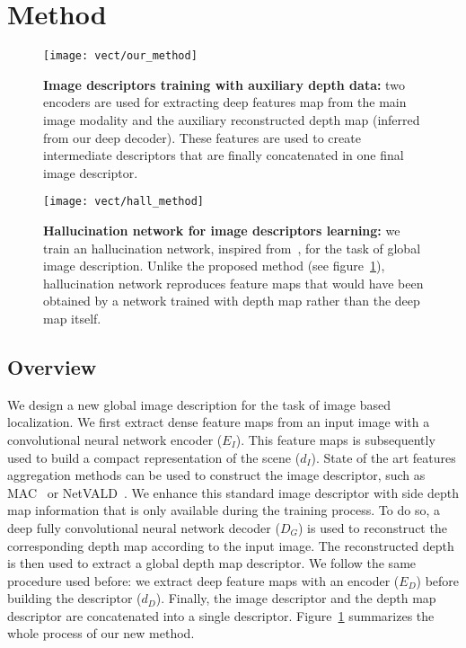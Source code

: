 \section{Method}
\label{sec:method}

\begin{figure}
	\center
	\texttt{[image: vect/our\_method]}
	\caption{\label{fig:our_method} \textbf{Image descriptors training with auxiliary depth data:} two encoders are used for extracting deep features map from the main image modality and the auxiliary reconstructed depth map (inferred from our deep decoder). These features are used to create intermediate descriptors that are finally concatenated in one final image descriptor.}
\end{figure}

\begin{figure}
	\center
	\texttt{[image: vect/hall\_method]}
	\caption{\label{fig:hall_method} \textbf{Hallucination network for image descriptors learning:} we train an hallucination network, inspired from~\cite{Hoffman2016}, for the task of global image description. Unlike the proposed method (see figure~\ref{fig:our_method}), hallucination network reproduces feature maps that would have been obtained by a network trained with depth map rather than the deep map itself.}
\end{figure}

\subsection{Overview}
\label{subsec:overview}
We design a new global image description for the task of image based localization. We first extract dense feature maps from an input image with a convolutional neural network encoder ($E_I$). This feature maps is subsequently used to build a compact representation of the scene ($d_I$). State of the art features aggregation methods can be used to construct the image descriptor, such as MAC~\cite{Radenovic2017} or NetVALD~\cite{Arandjelovic2017}. We enhance this standard image descriptor with side depth map information that is only available during the training process. To do so, a deep fully convolutional neural network decoder ($D_G$) is used to reconstruct the corresponding depth map according to the input image. The reconstructed depth is then used to extract a global depth map descriptor. We follow the same procedure used before: we extract deep feature maps with an encoder ($E_D$) before building the descriptor ($d_D$). Finally, the image descriptor and the depth map descriptor are concatenated into a single descriptor. Figure~\ref{fig:our_method} summarizes the whole process of our new method.

